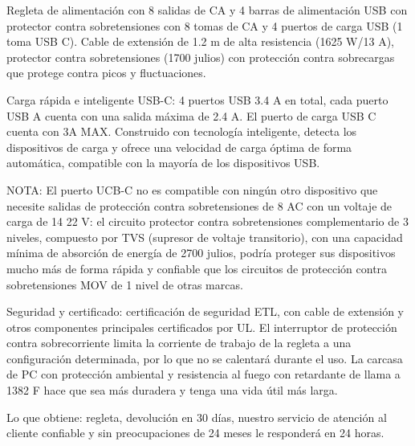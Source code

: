     Regleta de alimentación con 8 salidas de CA y 4 barras de alimentación USB con protector contra sobretensiones con 8 tomas de CA y 4 puertos de carga USB (1 toma USB C). Cable de extensión de 1.2 m de alta resistencia (1625 W/13 A), protector contra sobretensiones (1700 julios) con protección contra sobrecargas que protege contra picos y fluctuaciones.
    
    Carga rápida e inteligente USB-C: 4 puertos USB 3.4 A en total, cada puerto USB A cuenta con una salida máxima de 2.4 A. El puerto de carga USB C cuenta con 3A MAX. Construido con tecnología inteligente, detecta los dispositivos de carga y ofrece una velocidad de carga óptima de forma automática, compatible con la mayoría de los dispositivos USB.
    
    NOTA: El puerto UCB-C no es compatible con ningún otro dispositivo que necesite
    salidas de protección contra sobretensiones de 8 AC con un voltaje de carga de 14 22 V: el circuito protector contra sobretensiones complementario de 3 niveles, compuesto por TVS (supresor de voltaje transitorio), con una capacidad mínima de absorción de energía de 2700 julios, podría proteger sus dispositivos mucho más de forma rápida y confiable que los circuitos de protección contra sobretensiones MOV de 1 nivel de otras marcas.
    
    Seguridad y certificado: certificación de seguridad ETL, con cable de extensión y otros componentes principales certificados por UL. El interruptor de protección contra sobrecorriente limita la corriente de trabajo de la regleta a una configuración determinada, por lo que no se calentará durante el uso. La carcasa de PC con protección ambiental y resistencia al fuego con retardante de llama a 1382 F hace que sea más duradera y tenga una vida útil más larga.
    
    Lo que obtiene: regleta, devolución en 30 días, nuestro servicio de atención al cliente confiable y sin preocupaciones de 24 meses le responderá en 24 horas.
    
